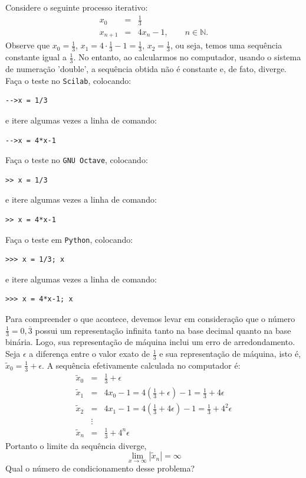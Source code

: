 \begin{ex} Considere o seguinte processo iterativo:
  \begin{eqnarray*}
    x_0 &=& \frac{1}{3}\\
    x_{n+1} &=& 4x_n-1,\qquad n\in\mathbb{N}.
  \end{eqnarray*}
Observe que $x_0=\frac{1}{3}$, $x_1=4\cdot \frac{1}{3}-1=\frac{1}{3}$, $x_2=\frac{1}{3}$, ou seja, temos uma sequência constante igual a $\frac{1}{3}$. No entanto, ao calcularmos no computador, usando o sistema de numeração 'double', a sequência obtida não é constante e, de fato, diverge.
\ifisscilab
Faça o teste no \verb+Scilab+, colocando:
\begin{verbatim}
-->x = 1/3
\end{verbatim}
e itere algumas vezes a linha de comando:
\begin{verbatim}
-->x = 4*x-1
\end{verbatim}
\fi
\ifisoctave
Faça o teste no \verb+GNU Octave+, colocando:
\begin{verbatim}
>> x = 1/3
\end{verbatim}
e itere algumas vezes a linha de comando:
\begin{verbatim}
>> x = 4*x-1
\end{verbatim}
\fi
\ifispython
Faça o teste em \verb+Python+, colocando:
\begin{verbatim}
>>> x = 1/3; x
\end{verbatim}
e itere algumas vezes a linha de comando:
\begin{verbatim}
>>> x = 4*x-1; x
\end{verbatim}
\fi

Para compreender o que acontece, devemos levar em consideração que o número $\frac{1}{3}=0,\overline{3}$ possui um representação infinita tanto na base decimal quanto na base binária. Logo, sua representação de máquina inclui um erro de arredondamento. Seja $\epsilon$ a diferença entre o valor exato de $\frac{1}{3}$ e sua representação de máquina, isto é, $\tilde{x}_0=\frac{1}{3}+\epsilon$. A sequência efetivamente calculada no computador é:
\begin{eqnarray*}
\tilde{x}_0&=&\frac{1}{3}+\epsilon\\
\tilde{x}_1&=&4x_0-1=4\left(\frac{1}{3}+\epsilon\right)-1=\frac{1}{3}+4\epsilon\\
\tilde{x}_2&=&4x_1-1=4\left(\frac{1}{3}+4\epsilon\right)-1=\frac{1}{3}+4^2\epsilon\\
&\vdots&\\
\tilde{x}_n&=&\frac{1}{3}+4^n\epsilon
\end{eqnarray*}
Portanto o limite da sequência diverge,
\begin{equation*}
\lim_{x\to\infty}|\tilde{x}_n|=\infty
\end{equation*}
Qual o número de condicionamento desse problema?
\end{ex}


